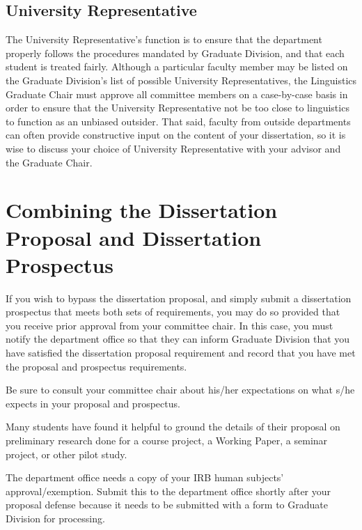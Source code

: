 \documentclass[
]{book}
\begin{document}
\hypertarget{university-representative}{%
\subsection*{University Representative}\label{university-representative}}

The University Representative's function is to ensure that the department properly follows the procedures mandated by Graduate Division, and that each student is treated fairly. Although a particular faculty member may be listed on the Graduate Division's list of possible University Representatives, the Linguistics Graduate Chair must approve all committee members on a case-by-case basis in order to ensure that the University Representative not be too close to linguistics to function as an unbiased outsider. That said, faculty from outside departments can often provide constructive input on the content of your dissertation, so it is wise to discuss your choice of University Representative with your advisor and the Graduate Chair.

\hypertarget{combining-the-dissertation-proposal-and-dissertation-prospectus}{%
\section{Combining the Dissertation Proposal and Dissertation Prospectus}\label{combining-the-dissertation-proposal-and-dissertation-prospectus}}

If you wish to bypass the dissertation proposal, and simply submit a dissertation prospectus that meets both sets of requirements, you may do so provided that you receive prior approval from your committee chair. In this case, you must notify the department office so that they can inform Graduate Division that you have satisfied the dissertation proposal requirement and record that you have met the proposal and prospectus requirements.

Be sure to consult your committee chair about his/her expectations on what s/he expects in your proposal and prospectus.

Many students have found it helpful to ground the details of their proposal on preliminary research done for a course project, a Working Paper, a seminar project, or other pilot study.

The department office needs a copy of your IRB human subjects' approval/exemption. Submit this to the department office shortly after your proposal defense because it needs to be submitted with a form to Graduate Division for processing.
\end{document}

